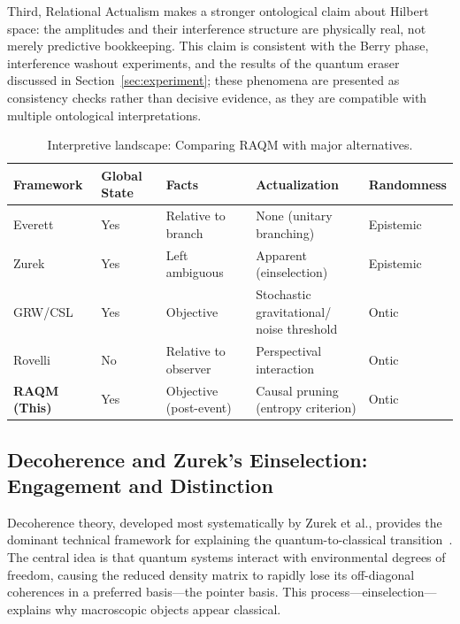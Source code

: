 \documentclass[11pt,a4paper]{article}
\theoremstyle{plain}
\theoremstyle{definition}
\theoremstyle{remark}
\begin{document}
Third, Relational Actualism makes a stronger ontological claim about Hilbert
space: the amplitudes and their interference structure are physically real, not
merely predictive bookkeeping. This claim is consistent with the Berry phase,
interference washout experiments, and the results of the quantum eraser discussed
in Section~\ref{sec:experiment}; these phenomena are presented as consistency
checks rather than decisive evidence, as they are compatible with multiple
ontological interpretations.

\begin{table}[ht]
\centering
\caption{Interpretive landscape: Comparing RAQM with major alternatives.}
\label{tab:landscape}
\small
\begin{tabular}{lllll}
\toprule
\textbf{Framework} & \textbf{Global State} & \textbf{Facts} &
\textbf{Actualization} & \textbf{Randomness}\\
\midrule
Everett \citep{Everett1957}
  & Yes & Relative to branch & None (unitary branching) & Epistemic\\[2pt]
Zurek \citep{Zurek2003}
  & Yes & Left ambiguous & Apparent (einselection) & Epistemic\\[2pt]
GRW/CSL \citep{Bassi2013}
  & Yes & Objective
  & \parbox[t]{3cm}{Stochastic gravitational/\\noise threshold} & Ontic\\[6pt]
Rovelli \citep{Rovelli1996}
  & No & Relative to observer & Perspectival interaction & Ontic\\[2pt]
\textbf{RAQM (This)}
  & Yes & Objective (post-event)
  & \parbox[t]{3cm}{Causal pruning\\(entropy criterion)} & Ontic\\
\bottomrule
\end{tabular}
\end{table}

\subsection{Decoherence and Zurek's Einselection: Engagement and Distinction}

Decoherence theory, developed most systematically by Zurek et al., provides the
dominant technical framework for explaining the quantum-to-classical
transition~\citep{Zurek1981,Zurek2003,JoosZeh1985}. The central idea is that
quantum systems interact with environmental degrees of freedom, causing the reduced
density matrix to rapidly lose its off-diagonal coherences in a preferred
basis---the pointer basis. This process---einselection---explains why macroscopic
objects appear classical.
\end{document}

